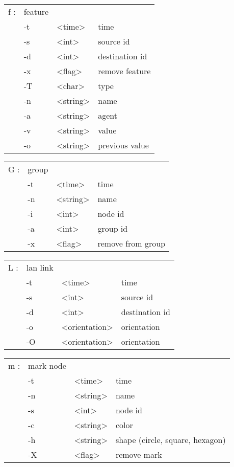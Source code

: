   \begin{tabular}{llll}
  f : & feature & & \\
    &  -t & <time> & time \\
    &  -s & <int> & source id \\
    &  -d & <int> & destination id \\
    &  -x & <flag> & remove feature \\
    &  -T & <char> & type \\
    &  -n & <string> & name \\
    &  -a & <string> & agent \\
    &  -v & <string> & value \\
    &  -o & <string> & previous value \\
  \end{tabular}

  \begin{tabular}{llll}
  G : & group & & \\
    &  -t & <time> & time \\
    &  -n & <string> & name \\
    &  -i & <int> & node id \\
    &  -a & <int> & group id \\
    &  -x & <flag> & remove from group \\
  \end{tabular}

  \begin{tabular}{llll}
  L : & lan link & & \\
    &  -t & <time> & time \\
    &  -s & <int> & source id \\
    &  -d & <int> & destination id \\
    &  -o & <orientation> & orientation \\
    &  -O & <orientation> & orientation \\
  \end{tabular}

  \begin{tabular}{llll}
  m : & mark node & & \\
    &  -t & <time> & time \\
    &  -n & <string> & name \\
    &  -s & <int> & node id \\
    &  -c & <string> & color \\
    &  -h & <string> & shape (circle, square, hexagon) \\
    &  -X & <flag> & remove mark \\
  \end{tabular}

